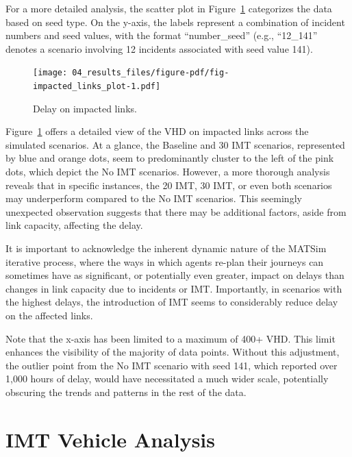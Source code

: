 \documentclass[fancy, oneside, mastersfancy, ms]{byuthesis}
\begin{document}
For a more detailed analysis, the scatter plot in
Figure~\ref{fig-impacted_links_plot} categorizes the data based on seed
type. On the y-axis, the labels represent a combination of incident
numbers and seed values, with the format ``number\_seed'' (e.g.,
``12\_141'' denotes a scenario involving 12 incidents associated with
seed value 141).

\begin{figure}

{\centering \texttt{[image: 04\_results\_files/figure-pdf/fig-impacted\_links\_plot-1.pdf]}

}

\caption{\label{fig-impacted_links_plot}Delay on impacted links.}

\end{figure}

Figure~\ref{fig-impacted_links_plot} offers a detailed view of the VHD
on impacted links across the simulated scenarios. At a glance, the
Baseline and 30 IMT scenarios, represented by blue and orange dots, seem
to predominantly cluster to the left of the pink dots, which depict the
No IMT scenarios. However, a more thorough analysis reveals that in
specific instances, the 20 IMT, 30 IMT, or even both scenarios may
underperform compared to the No IMT scenarios. This seemingly unexpected
observation suggests that there may be additional factors, aside from
link capacity, affecting the delay.

It is important to acknowledge the inherent dynamic nature of the MATSim
iterative process, where the ways in which agents re-plan their journeys
can sometimes have as significant, or potentially even greater, impact
on delays than changes in link capacity due to incidents or IMT.
Importantly, in scenarios with the highest delays, the introduction of
IMT seems to considerably reduce delay on the affected links.

Note that the x-axis has been limited to a maximum of 400+ VHD. This
limit enhances the visibility of the majority of data points. Without
this adjustment, the outlier point from the No IMT scenario with seed
141, which reported over 1,000 hours of delay, would have necessitated a
much wider scale, potentially obscuring the trends and patterns in the
rest of the data.

\hypertarget{imt-vehicle-analysis}{%
\section{IMT Vehicle Analysis}\label{imt-vehicle-analysis}}
\end{document}
